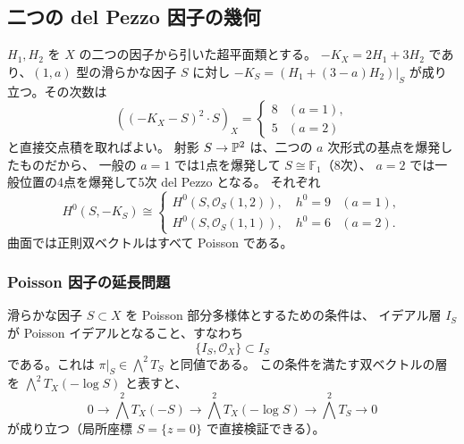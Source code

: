 \subsection{二つの del Pezzo 因子の幾何}
$H_1,H_2$ を $X$ の二つの因子から引いた超平面類とする。
$-K_X=2H_1+3H_2$ であり、$(1,a)$ 型の滑らかな因子 $S$ に対し
$-K_S=(H_1+(3-a)H_2)|_S$ が成り立つ。その次数は
\[
((-K_X-S)^2\cdot S)_X=
\begin{cases}8&(a=1),\\5&(a=2)\end{cases}
\]
と直接交点積を取ればよい。
射影 $S\to\mathbb P^2$ は、二つの $a$ 次形式の基点を爆発したものだから、
一般の $a=1$ では1点を爆発して $S\cong\mathbb F_1$（8次）、
$a=2$ では一般位置の4点を爆発して5次 del Pezzo となる。
それぞれ
\[
H^0(S,-K_S)\cong
\begin{cases}
H^0(S,\mathcal O_S(1,2)),\quad h^0=9 &(a=1),\\
H^0(S,\mathcal O_S(1,1)),\quad h^0=6 &(a=2).
\end{cases}
\]
曲面では正則双ベクトルはすべて Poisson である。

\subsubsection{Poisson 因子の延長問題}
滑らかな因子 $S\subset X$ を Poisson 部分多様体とするための条件は、
イデアル層 $I_S$ が Poisson イデアルとなること、すなわち
\[
\{I_S,\mathcal O_X\}\subset I_S
\]
である\cite[\S4.1]{p12-Pym}。これは $\pi|_S\in\bigwedge^2T_S$ と同値である。
この条件を満たす双ベクトルの層を $\bigwedge^2T_X(-\log S)$ と表すと、
\begin{equation}\label{p12:eq:log-exact}
0\longrightarrow \bigwedge^2T_X(-S)
\longrightarrow \bigwedge^2T_X(-\log S)
\longrightarrow \bigwedge^2T_S\longrightarrow0
\end{equation}
が成り立つ（局所座標 $S=\{z=0\}$ で直接検証できる）。

